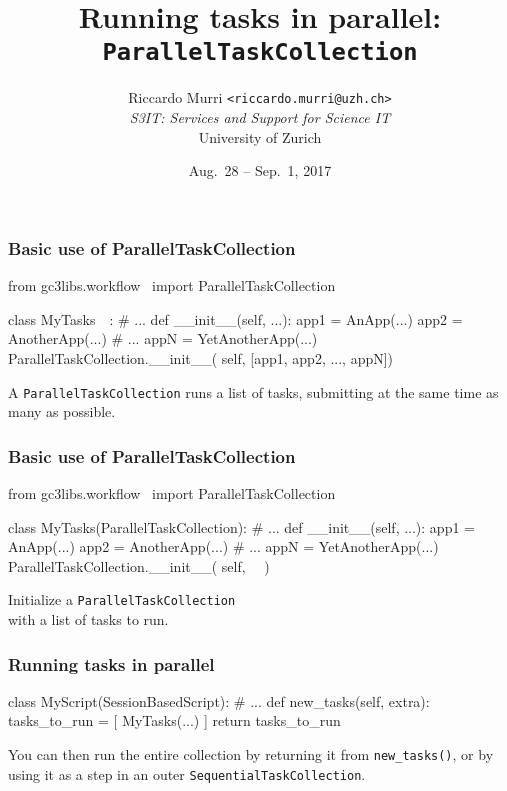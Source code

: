 \documentclass[english,serif,mathserif,xcolor=pdftex,dvipsnames,table]{beamer}
\title[Sequencing tasks]{%
  Running tasks in parallel: \\
  \texttt{ParallelTaskCollection}
}
\author[R. Murri, S3IT UZH]{%
  Riccardo Murri \texttt{<riccardo.murri@uzh.ch>}
  \\[1ex]
  \emph{S3IT: Services and Support for Science IT}
  \\[1ex]
  University of Zurich
}
\date{Aug.~28 -- Sep.~1, 2017}
\begin{document}
\maketitle


\begin{frame}[fragile]
  \frametitle{Basic use of ParallelTaskCollection}

\begin{python}
from gc3libs.workflow \
  import ParallelTaskCollection

class MyTasks~~:
  # ...
  def __init__(self, ...):
    app1 = AnApp(...)
    app2 = AnotherApp(...)
    # ...
    appN = YetAnotherApp(...)
    ParallelTaskCollection.__init__(
      self, [app1, app2, ..., appN])
\end{python}

  \+ A \texttt{ParallelTaskCollection} runs a list of tasks, submitting
  at the same time as many as possible.
\end{frame}


\begin{frame}[fragile]
  \frametitle{Basic use of ParallelTaskCollection}

\begin{python}
from gc3libs.workflow \
  import ParallelTaskCollection

class MyTasks(ParallelTaskCollection):
  # ...
  def __init__(self, ...):
    app1 = AnApp(...)
    app2 = AnotherApp(...)
    # ...
    appN = YetAnotherApp(...)
    ParallelTaskCollection.__init__(
      self, ~~)
\end{python}

  \+
  Initialize a \texttt{ParallelTaskCollection} \\
  with a list of tasks to run.
\end{frame}


\begin{frame}[fragile]
  \frametitle{Running tasks in parallel}

\begin{python}
class MyScript(SessionBasedScript):
  # ...
  def new_tasks(self, extra):
    tasks_to_run = [
      MyTasks(...)
    ]
    return tasks_to_run
\end{python}

  \+ You can then run the entire collection by returning it from
  \lstinline|new_tasks()|, or by using it as a step in an outer
  \texttt{SequentialTaskCollection}.
\end{frame}
\end{document}
